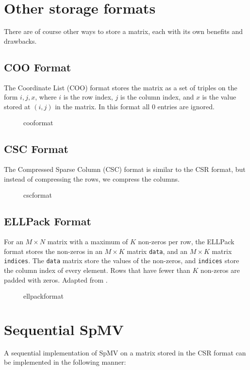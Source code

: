 \section{Other storage formats}
There are of course other ways to store a matrix, each with its own benefits and drawbacks.

\subsection{COO Format}
The Coordinate List (COO) format stores the matrix as a set of triples on the form \(i,j,x\), where \(i\) is the row index, \(j\) is the column index, and \(x\) is the value stored at \((i,j)\) in the matrix. In this format all \(0\) entries are ignored.

\begin{figure}[H]
    \centering
    \caption{cooformat}
    \label{fig:cooformat}
\end{figure}


\subsection{CSC Format}
The Compressed Sparse Column (CSC) format is similar to the CSR format, but instead of compressing the rows, we compress the columns.

\begin{figure}[H]
    \centering
    \caption{cscformat}
    \label{fig:cscformat}
\end{figure}

\subsection{ELLPack Format}
For an \(M \times  N\) matrix with a maximum of \(K\) non-zeros per row, the ELLPack format stores the non-zeros in an \(M \times  K\) matrix \texttt{data}, and an \(M \times  K\) matrix \texttt{indices}. The \texttt{data} matrix store the values of the non-zeros, and \texttt{indices} store the column index of every element. Rows that have fewer than \(K\) non-zeros are padded with zeros. Adapted from \cite{ellpackformat}.

\begin{figure}[ht]
    \centering
    \caption{ellpackformat}
    \label{fig:ellpackformat}
\end{figure}


\section{Sequential SpMV}
A sequential implementation of SpMV on a matrix stored in the CSR format can be implemented in the following manner:
\medskip

